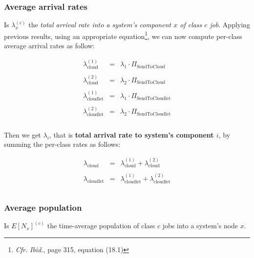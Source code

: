 \documentclass[10pt,a4paper]{article}
\begin{document}
\subsubsection{Average arrival rates}

Is $\lambda_x^{(c)}$ the \textit{total arrival rate into a system's component $x$ of class $c$ job}. Applying previous results, using an appropriate equation\footnote{\textit{Cfr.} \textit{Ibid.}, page 315, equation (18.1)}, we can now compute per-class average arrival rates as follow:

\begin{equation}
\begin{array} {rcl}

\lambda_{\text{cloud}}^{(1)} & = & \lambda_1\cdot \Pi_{\text{SendToCloud}} \\\\
\lambda_{\text{cloud}}^{(2)} & = & \lambda_2\cdot \Pi_{\text{SendToCloud}} \\\\
\lambda_{\text{cloudlet}}^{(1)} & = & \lambda_1\cdot \Pi_{\text{SendToCloudlet}} \\\\
\lambda_{\text{cloudlet}}^{(2)} & = & \lambda_2\cdot \Pi_{\text{SendToCloudlet}} \\\\
\end{array}
\end{equation}

Then we get $\lambda_i$, that is \textbf{total arrival rate to system's component $i$}, by summing the per-class rates as follows:

\begin{equation}
\begin{array} {rcl}
\lambda_{\text{cloud}} & = & \lambda_{\text{cloud}}^{(1)} + \lambda_{\text{cloud}}^{(2)} \\\\
\lambda_{\text{cloudlet}} & = & \lambda_{\text{cloudlet}}^{(1)} + \lambda_{\text{cloudlet}}^{(2)} \\\\
\end{array}
\end{equation}


\subsubsection{Average population}

Is $E[N_x]^{(c)}$ the time-average population of class $c$ jobs into a system's node $x$. 
\end{document}
